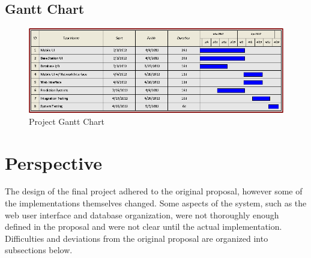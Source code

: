\documentclass[11pt]{article} %
\begin{document}
\subsection{Gantt Chart}
\begin{figure}[h!]
\begin{center}
\includegraphics[scale=0.65]{../Graphics/GanttChart}
\caption{Project Gantt Chart}
\end{center}
\end{figure}

\section{Perspective}
The design of the final project adhered to the original proposal, however some of the implementations themselves changed. Some aspects of the system, such as the web user interface and database organization, were not thoroughly enough defined in the proposal and were not clear until the actual implementation. Difficulties and deviations from the original proposal are organized into subsections below.
\end{document}
